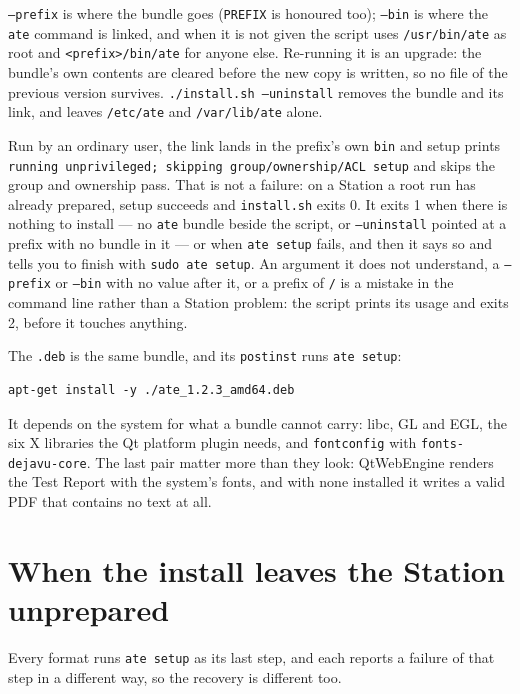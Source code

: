 \texttt{--prefix} is where the bundle goes (\texttt{PREFIX} is honoured too); \texttt{--bin} is
where the \texttt{ate} command is linked, and when it is not given the script uses
\texttt{/usr/bin/ate} as root and \texttt{<prefix>/bin/ate} for anyone else. Re-running it is an
upgrade: the bundle's own contents are cleared before the new copy is written, so no file of the
previous version survives. \texttt{./install.sh --uninstall} removes the bundle and its link, and
leaves \texttt{/etc/ate} and \texttt{/var/lib/ate} alone.

Run by an ordinary user, the link lands in the prefix's own \texttt{bin} and setup prints
\texttt{running unprivileged; skipping group/ownership/ACL setup} and skips the group and ownership
pass. That is not a failure: on a Station a root run has already prepared, setup succeeds and
\texttt{install.sh} exits 0. It exits 1 when there is nothing to install --- no \texttt{ate} bundle
beside the script, or \texttt{--uninstall} pointed at a prefix with no bundle in it --- or when
\texttt{ate setup} fails, and then it says so and tells you to finish with \texttt{sudo ate setup}.
An argument it does not understand, a \texttt{--prefix} or \texttt{--bin} with no value after it, or a
prefix of \texttt{/} is a mistake in the command line rather than a Station problem: the script prints
its usage and exits 2, before it touches anything.

The \texttt{.deb} is the same bundle, and its \texttt{postinst} runs \texttt{ate setup}:

\begin{lstlisting}[language=ATEShell]
apt-get install -y ./ate_1.2.3_amd64.deb
\end{lstlisting}

It depends on the system for what a bundle cannot carry: libc, GL and EGL, the six X libraries the
Qt platform plugin needs, and \texttt{fontconfig} with \texttt{fonts-dejavu-core}. The last pair
matter more than they look: QtWebEngine renders the Test Report with the system's fonts, and with
none installed it writes a valid PDF that contains no text at all.

\section{When the install leaves the Station unprepared}

Every format runs \texttt{ate setup} as its last step, and each reports a failure of that step in a
different way, so the recovery is different too.

